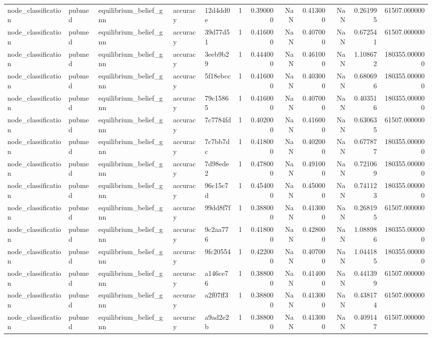\begin{tabular}{lllllrrrrrrr}
node_classification & pubmed & equilibrium_belief_gnn & accuracy & 12d4dd0e & 1 & 0.390000 & NaN & 0.413000 & NaN & 0.261995 & 61507.000000 \\
node_classification & pubmed & equilibrium_belief_gnn & accuracy & 39d77d51 & 1 & 0.416000 & NaN & 0.407000 & NaN & 0.672541 & 61507.000000 \\
node_classification & pubmed & equilibrium_belief_gnn & accuracy & 3eeb9b29 & 1 & 0.444000 & NaN & 0.461000 & NaN & 1.108672 & 180355.000000 \\
node_classification & pubmed & equilibrium_belief_gnn & accuracy & 5f18ebcc & 1 & 0.416000 & NaN & 0.403000 & NaN & 0.680696 & 180355.000000 \\
node_classification & pubmed & equilibrium_belief_gnn & accuracy & 79c15865 & 1 & 0.416000 & NaN & 0.407000 & NaN & 0.403516 & 180355.000000 \\
node_classification & pubmed & equilibrium_belief_gnn & accuracy & 7c7784fd & 1 & 0.402000 & NaN & 0.416000 & NaN & 0.630635 & 61507.000000 \\
node_classification & pubmed & equilibrium_belief_gnn & accuracy & 7c7bb7dc & 1 & 0.418000 & NaN & 0.402000 & NaN & 0.677877 & 180355.000000 \\
node_classification & pubmed & equilibrium_belief_gnn & accuracy & 7d98ede2 & 1 & 0.478000 & NaN & 0.491000 & NaN & 0.721069 & 180355.000000 \\
node_classification & pubmed & equilibrium_belief_gnn & accuracy & 96c15c7d & 1 & 0.454000 & NaN & 0.450000 & NaN & 0.741123 & 180355.000000 \\
node_classification & pubmed & equilibrium_belief_gnn & accuracy & 99dd8f7f & 1 & 0.388000 & NaN & 0.413000 & NaN & 0.268195 & 61507.000000 \\
node_classification & pubmed & equilibrium_belief_gnn & accuracy & 9c2aa776 & 1 & 0.418000 & NaN & 0.428000 & NaN & 1.088986 & 180355.000000 \\
node_classification & pubmed & equilibrium_belief_gnn & accuracy & 9fc20554 & 1 & 0.422000 & NaN & 0.407000 & NaN & 1.044185 & 180355.000000 \\
node_classification & pubmed & equilibrium_belief_gnn & accuracy & a146ce76 & 1 & 0.388000 & NaN & 0.414000 & NaN & 0.441399 & 61507.000000 \\
node_classification & pubmed & equilibrium_belief_gnn & accuracy & a2f07ff3 & 1 & 0.388000 & NaN & 0.413000 & NaN & 0.438174 & 61507.000000 \\
node_classification & pubmed & equilibrium_belief_gnn & accuracy & a9ad2e2b & 1 & 0.388000 & NaN & 0.413000 & NaN & 0.409147 & 61507.000000 \\

\end{tabular}
